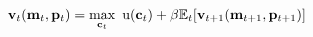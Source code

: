   \begin{equation}\begin{gathered}\begin{aligned}
        {\mathbf{v}}_{t}(\mathbf{m}_{t},\mathbf{p}_{t})  & = \max_{\mathbf{c}_{t}}~ \mathrm{u}(\mathbf{c}_{t}) + {\beta}{\mathbb{E}}_{t}[ {\mathbf{v}}_{t+1}({\mathbf{m}}_{t+1},\mathbf{p}_{t+1})]\label{eq:vrecurse}
      \end{aligned}\end{gathered}\end{equation}
